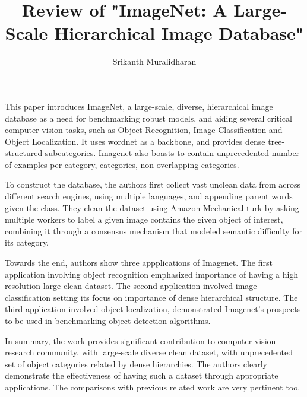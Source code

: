 \documentclass[]{article}
\title{Review of "ImageNet: A Large-Scale Hierarchical Image Database"}
\author{Srikanth Muralidharan}
\begin{document}
\maketitle

This paper introduces ImageNet, a large-scale, diverse, hierarchical image database as a need for benchmarking robust models, and aiding several critical computer vision tasks, 
such as Object Recognition, Image Classification and Object Localization. It uses wordnet as a backbone, and provides dense
tree-structured subcategories. Imagenet also boasts to contain unprecedented number of examples per category, categories,
non-overlapping categories.
\par
To construct the database, the authors first collect vast unclean data from across different search engines, using multiple
languages, and appending parent words given the class. They clean the dataset using Amazon Mechanical turk by
asking multiple workers to label a given image contains the given object of interest, combining it through a consensus
mechanism that modeled semantic difficulty for its category.
\par
Towards the end, authors show three appplications of Imagenet. The first application involving  object recognition emphasized importance
of having a high resolution large clean dataset. The second application involved image classification setting its focus on importance of dense 
hierarchical structure. The third application involved object localization, demonstrated Imagenet's 
prospects to be used in benchmarking object detection algorithms.
\par
In summary, the work provides significant contribution to computer vision research community, with large-scale diverse
clean dataset, with unprecedented set of object categories related by dense hierarchies. The authors clearly demonstrate
the effectiveness of having such a dataset through appropriate applications. The comparisons with previous related work
are very pertinent too.
\end{document}
